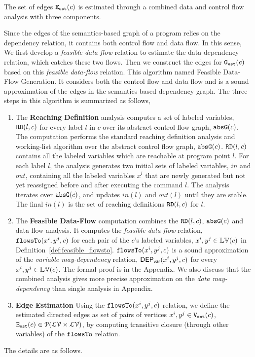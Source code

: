 The set of edges $\mathtt{{E_{est}}}(c)$ is estimated through a combined data and control flow analysis with three components.

Since the edges of the semantics-based graph of a program relies on the dependency relation, it contains both control flow and data flow. 
In this sense, We first develop a \emph{feasible data-flow} relation to estimate the data dependency relation, which catches these two flows.
Then we construct the edges for $\mathtt{{G_{est}}}(c)$ based on this \emph{feasible data-flow} relation.
This algorithm named Feasible Data-Flow Generation. It 
considers both the control flow and data flow and
is a sound approximation of the edges in the semantics based dependency graph.
The three steps in this algorithm is summarized as follows,
\begin{enumerate}
  \item The \textbf{Reaching Definition} analysis computes a set of labeled variables, $\mathtt{RD}(l, c)$ for every label $l$ in $c$
  over its abstract control flow graph, $\mathtt{abs}{\mathtt{G}}(c)$.
  The computation performs the standard reaching definition analysis and working-list algorithm over the abstract control flow graph, $\mathtt{abs}{\mathtt{G}}(c)$. 
  $\mathtt{RD}(l, c)$ contains all the labeled variables which are reachable at program point $l$. 
  For each label $l$, the analysis generates two initial sets of labeled variables, $in$ and $out$, 
  containing all the labeled variables $x^l$ that are newly generated but not yet reassigned before and after executing the command $l$.
  The analysis iterates over $\mathtt{abs}{\mathtt{G}}(c)$, and updates $in(l)$ and $out(l)$ until they  are stable.
  The final $in(l)$ is the set of reaching definitions $\mathtt{RD}(l, c)$ for $l$. 
    \item The \textbf{Feasible Data-Flow} computation combines the $\mathtt{RD}(l, c)$, $\mathtt{abs}{\mathtt{G}}(c)$ and data flow analysis. 
  It computes the \emph{feasible data-flow} relation,
  $\mathtt{flowsTo}(x^i, y^j, c)$ for each pair of the $c$'s labeled variables, $x^i, y^j \in \mathbb{LV}(c)$ in Definition~\ref{def:feasible_flowsto}. $\mathtt{flowsTo}(x^i, y^j, c)$ is a sound approximation 
  of the \emph{variable may-dependency} relation, $\mathsf{DEP_{var}}(x^i, y^j, c)$ for every $x^i, y^j \in \mathbb{LV}(c)$.
  The formal proof is in the Appendix. We also discuss that the combined analysis gives more precise approximation on the \emph{data may-dependency} than single analysis in Appendix.
\item \textbf{Edge Estimation}
Using the $\mathtt{flowsTo}(x^i, y^j, c)$ relation, we define the estimated directed edges
as set of pairs of vertices $x^i, y^j\in \mathtt{{V_{est}}}(c)$,
$\mathtt{{E_{est}}}(c) \in \mathcal{P}( \mathcal{LV} \times \mathcal{LV})$, by computing
transitive closure (through other variables) of the  
 $\mathtt{flowsTo}$ relation.
\end{enumerate} 
The details are as follows.
%
